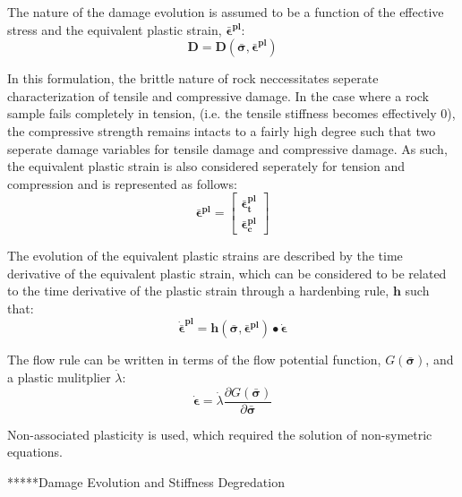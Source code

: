 The nature of the damage evolution is assumed to be a function of the effective stress and the equivalent plastic strain, $\boldsymbol{\bar{\epsilon}^{pl}}$:
\begin{equation}
\label{eqn:const8}
\mathbf{D} = \mathbf{D}(\boldsymbol{\bar{\sigma}}, \boldsymbol{\bar{\epsilon}^{pl}})
\end{equation}

In this formulation, the brittle nature of rock neccessitates seperate characterization of tensile and compressive damage. In the case where a rock sample fails completely in tension, (i.e. the tensile stiffness becomes effectively 0), the compressive strength remains intacts to a fairly high degree such that two seperate damage variables for tensile damage and compressive damage. As such, the equivalent plastic strain is also considered seperately for tension and compression and is represented as follows:
\begin{equation}
\label{eqn:const9}
\boldsymbol{\bar{\epsilon}^{pl}} = \begin{bmatrix} 
	\boldsymbol{\bar{\epsilon}_t^{pl}} \\ 
	\boldsymbol{\bar{\epsilon}_c^{pl}} \end{bmatrix}
\end{equation}

The evolution of the equivalent plastic strains are described by the time derivative of the equivalent plastic strain, which can be considered to be related to the time derivative of the plastic strain through a hardenbing rule, $\mathbf{h}$ such that:
\begin{equation}
\label{eqn:const10}
\boldsymbol{\dot{\bar{\epsilon}}^{pl}} = \mathbf{h}(\boldsymbol{\bar{\sigma}},
	\boldsymbol{\bar{\epsilon}^{pl}})\bullet \boldsymbol{\dot{\epsilon}} 
\end{equation}

The flow rule can be written in terms of the flow potential function, $G(\boldsymbol{\bar{\sigma}})$, and a plastic mulitplier $\dot{\lambda}$:
\begin{equation}
\label{eqn:const11}
\boldsymbol{\dot{\epsilon}} = \dot{\lambda} \dfrac{\partial G(\boldsymbol{\bar{\sigma}})}{\partial \boldsymbol{\bar{\sigma}}}
\end{equation}

Non-associated plasticity  is used, which required the solution of non-symetric equations.


*****Damage Evolution and Stiffness Degredation

